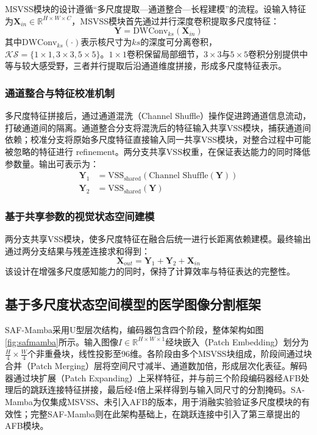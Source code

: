 \documentclass[12pt, a4paper, twoside]{article}
\begin{document}
MSVSS模块的设计遵循“多尺度提取—通道整合—长程建模”的流程。设输入特征为$\mathbf{X}_{in} \in \mathbb{R}^{H \times W \times C}$，MSVSS模块首先通过并行深度卷积提取多尺度特征：
\begin{equation}
\mathbf{Y} = \text{DWConv}_{ks}(\mathbf{X}_{in})
\end{equation}
其中$\text{DWConv}_{ks}(\cdot)$表示核尺寸为$ks$的深度可分离卷积，$\mathcal{KS} = \{1 \times 1, 3 \times 3, 5 \times 5\}$。$1 \times 1$卷积保留局部细节，$3 \times 3$与$5 \times 5$卷积分别提供中等与较大感受野，三者并行提取后沿通道维度拼接，形成多尺度特征表示。

\subsubsection{通道整合与特征校准机制}

多尺度特征拼接后，通过通道混洗（Channel Shuffle）操作促进跨通道信息流动，打破通道间的隔离。通道整合分支将混洗后的特征输入共享VSS模块，捕获通道间依赖；校准分支将原始多尺度特征直接输入同一共享VSS模块，对整合过程中可能被忽略的特征进行 refinement。两分支共享VSS权重，在保证表达能力的同时降低参数量。输出可表示为：
\begin{equation}
\begin{aligned}
\mathbf{Y}_1 &= \text{VSS}_{\text{shared}}(\text{Channel Shuffle}(\mathbf{Y})) \\
\mathbf{Y}_2 &= \text{VSS}_{\text{shared}}(\mathbf{Y})
\end{aligned}
\end{equation}

\subsubsection{基于共享参数的视觉状态空间建模}

两分支共享VSS模块，使多尺度特征在融合后统一进行长距离依赖建模。最终输出通过两分支结果与残差连接求和得到：
\begin{equation}
\mathbf{X}_{out} = \mathbf{Y}_1 + \mathbf{Y}_2 + \mathbf{X}_{in}
\end{equation}
该设计在增强多尺度感知能力的同时，保持了计算效率与特征表达的完整性。

\subsection{基于多尺度状态空间模型的医学图像分割框架}

SAF-Mamba采用U型层次结构，编码器包含四个阶段，整体架构如图\ref{fig:safmamba}所示。输入图像$I \in \mathbb{R}^{H \times W \times 1}$经块嵌入（Patch Embedding）划分为$\frac{H}{4} \times \frac{W}{4}$个非重叠块，线性投影至96维。各阶段由多个MSVSS块组成，阶段间通过块合并（Patch Merging）层将空间尺寸减半、通道数加倍，形成层次化表征。解码器通过块扩展（Patch Expanding）上采样特征，并与前三个阶段编码器经AFB处理后的跳跃连接特征拼接，最后经4倍上采样得到与输入同尺寸的分割掩码。SA-Mamba为仅集成MSVSS、未引入AFB的版本，用于消融实验验证多尺度模块的有效性；完整SAF-Mamba则在此架构基础上，在跳跃连接中引入了第三章提出的AFB模块。
\end{document}
